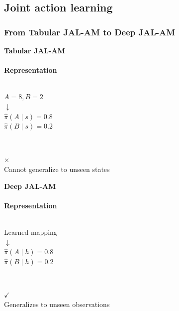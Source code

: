 \subsection{Joint action learning}
\begin{frame}
\frametitle{From Tabular JAL-AM to Deep JAL-AM}

\centering
\begin{minipage}[t]{0.47\textwidth}
    \centering
    \vspace{-0.75cm}
    \textbf{\small Tabular JAL-AM}\\[0.42em]
    \vspace{-0.10em}
    \\[0.82em]
    \textbf{Representation}\\[0.72em]
    \\[0.70em]
    \parbox[c][1.42cm][c]{0.86\linewidth}{\centering $A = 8, B = 2$\\[0.22em]$\downarrow$\\[0.20em]$\hat{\pi}(A \mid s)=0.8$\\[0.14em]$\hat{\pi}(B \mid s)=0.2$}\\[0.62em]
    \parbox[c][0.95cm][c]{0.86\linewidth}{\centering\fontsize{15}{16}\selectfont\color{red!70!black} $\times$\\[-0.15em]\large Cannot generalize to unseen states}
\end{minipage}\hfill
\begin{minipage}[t]{0.47\textwidth}
    \centering
    \vspace{-0.75cm}
    \textbf{\small Deep JAL-AM}\\[0.42em]
    \vspace{-0.10em}
    \\[0.82em]
    \textbf{Representation}\\[0.72em]
    \\[0.70em]
    \parbox[c][1.42cm][c]{0.86\linewidth}{\centering Learned mapping\\[0.22em]$\downarrow$\\[0.20em]$\hat{\pi}(A \mid h)=0.8$\\[0.14em]$\hat{\pi}(B \mid h)=0.2$}\\[0.62em]
    \parbox[c][0.95cm][c]{0.86\linewidth}{\centering\fontsize{15}{16}\selectfont\color{green!55!black} $\checkmark$\\[-0.15em]\large Generalizes to unseen observations}
\end{minipage}

\end{frame}

